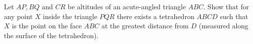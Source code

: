 Let $AP,BQ$ and $CR$ be altitudes of an acute-angled triangle $ABC$. Show that for any point $X$ inside the triangle $PQR$ there exists a tetrahedron $ABCD$ such that $X$ is the point on the face $ABC$ at the greatest distance from $D$ (measured along the surface of the tetrahedron).